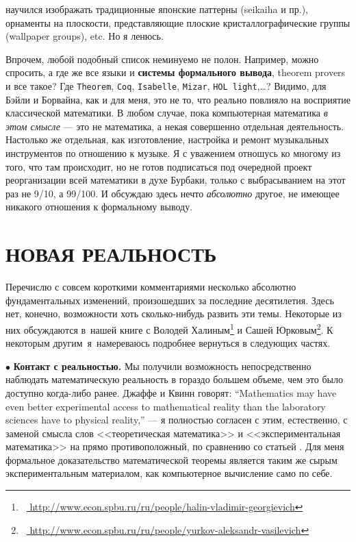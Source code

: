 \documentclass[intlimits,twoside,a4paper,11pt]{article}
\begin{document}
		научился изображать традиционные японские паттерны (seikaiha и пр.),
		орнаменты на плоскости, представляющие плоские кристаллографические 
		группы (wallpaper groups), etc. Но я ленюсь.
		\par\smallskip
		Впрочем, любой подобный список неминуемо не полон. Например, можно спросить,
		а где же все языки и {\bf системы формального вывода}, theorem provers и все такое?
		Где {\tt Theorem}, {\tt Coq}, {\tt Isabelle}, {\tt Mizar}, {\tt HOL light},\ldots? Видимо, 
		для Бэйли и Борвайна, как и для меня, это не то, что реально повлияло на 
		восприятие классической математики. В любом случае, пока компьютерная
		математика {\it в этом смысле\/} --- это не математика, а некая совершенно 
		отдельная деятельность. Настолько же отдельная, как изготовление, настройка
		и ремонт музыкальных инструментов по отношению к музыке.
		Я с уважением отношусь ко многому из того, что там происходит, но не готов
		подписаться под очередной проект реорганизации всей математики в духе
		Бурбаки, только с выбрасыванием на этот раз не 9/10, а 99/100. И обсуждаю 
		здесь нечто {\it абсолютно\/} другое, не имеющее никакого отношения к 
		формальному выводу.
		
		
		
		\section{НОВАЯ РЕАЛЬНОСТЬ}
		
		Перечислю с совсем короткими комментариями несколько абсолютно фундаментальных 
		изменений, произошедших за последние десятилетия. Здесь нет, конечно,
		возможности хоть сколько-нибудь развить эти темы. Некоторые из них обсуждаются 
		в~нашей книге  \cite{VHY} с Володей Халиным\footnote{~\url{
				http://www.econ.spbu.ru/ru/people/halin-vladimir-georgievich}}
		и Сашей Юрковым\footnote{~\url{ 
				http://www.econ.spbu.ru/ru/people/yurkov-aleksandr-vasilevich}}.
		К некоторым другим~я~намереваюсь подробнее вернуться в следующих частях.
		
		\par\smallskip
		$\bullet$ {\bf Контакт с реальностью.} Мы получили возможность непосредственно
		наблюдать математическую реальность в гораздо большем объеме, чем это
		было доступно когда-либо ранее.
		Джаффе и Квинн говорят: ``Mathematics may have even better experimental 
		access to mathematical reality than the laboratory sciences have to physical reality,''
		--- я полностью согласен с этим, естественно, с заменой смысла слов 
		<<теоретическая математика>> и <<экспериментальная математика>> на прямо 
		противоположный, по сравнению со статьей \cite{JQ}. Для меня формальное
		доказательство математической теоремы является таким же сырым экспериментальным
		материалом, как компьютерное вычисление само по себе. 
		
\end{document}
